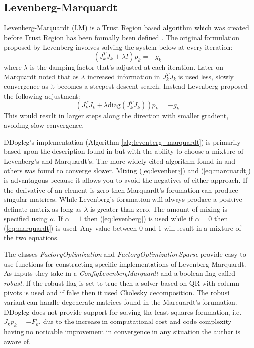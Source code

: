 \documentclass[peerreview,compsoc,onecolumn]{IEEEtran}
\begin{document}
\subsection{Levenberg-Marquardt}

Levenberg-Marquardt (LM) is a Trust Region based algorithm which was created before Trust Region has been formally been defined \cite{numopt2006,fletcher1987,dennis1996}. The original formulation proposed by Levenberg \cite{levenberg1944} involves solving the system below at every iteration:
\begin{equation}
\label{eq:levenberg}
(J_k^T J_k + \lambda I) p_k = -g_k
\end{equation} 
where $\lambda$ is the damping factor that's adjusted at each iteration. Later on Marquardt \cite{marquardt1963} noted that as $\lambda$ increased information in $J_k^T J_k$ is used less, slowly convergence as it becomes a steepest descent search. Instead Levenberg proposed the following adjustment:
\begin{equation}
\label{eq:marquardt}
(J_k^T J_k + \lambda \mbox{diag}(J_k^T J_k)) p_k = -g_k
\end{equation} 
This would result in larger steps along the direction with smaller gradient, avoiding slow convergence.

DDogleg's implementation (Algorithm \ref{alg:levenberg_marquardt}) is primarily based upon the description found in \cite{IMM2004} but with the ability to choose a mixture of Levenberg's and Marquardt's. The more widely cited algorithm found in \cite{fletcher1987} and others was found to converge slower. Mixing (\ref{eq:levenberg}) and (\ref{eq:marquardt}) is advantagous because it allows you to avoid the negatives of either approach. If the derivative of an element is zero then Marquardt's forumation can produce singular matrices. While Levenberg's forumation will always produce a positive-definate matrix as long as $\lambda$ is greater than zero. The amount of mixing is specified using $\alpha$. If $\alpha=1$ then (\ref{eq:levenberg}) is used while if $\alpha=0$ then (\ref{eq:marquardt}) is used. Any value between 0 and 1 will result in a mixture of the two equations.

The classes \emph{FactoryOptimization} and \emph{FactoryOptimizationSparse} provide easy to use functions for constructing specific implementations of Levenberg-Marquardt. As inputs they take in a \emph{ConfigLevenbergMarquardt} and a boolean flag called \emph{robust}. If the robust flag is set to true then a solver based on QR with column pivots is used and if false then it used Cholesky decomposition. The robust variant can handle degenerate matrices found in the Marquardt's forumation. DDogleg does not provide support for solving the least squares forumation, i.e. $J_k p_k = -F_k$, due to the increase in computational cost and code complexity having no noticable improvement in convergence in any situation the author is aware of.
\end{document}

